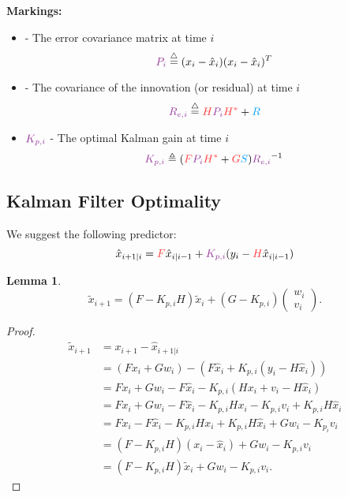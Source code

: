 \documentclass[a4 paper]{article}
\numberwithin{equation}{section}
\theoremstyle{boldStyle}
\theoremstyle{boldBlueStyle}
\newtheorem{lemma}{Lemma}[section]
\theoremstyle{boldPurpleStyle}
\theoremstyle{boldRedStyle}
\theoremstyle{boldGreenStyle}
\begin{document}
\textbf{Markings:}
\begin{itemize}
    \item {} - The error covariance matrix at time \( i \)
    \begin{equation}
        \tpur{P_i} \eqdef (x_i - \hat{x}_i)(x_i - \hat{x}_i)^T
    \end{equation}

    \item {} - The covariance of the innovation (or residual) at time \( i \)
    \begin{equation}
        \tpur{R_{e,i}} \eqdef \tred{H} \tpur{P_i} \tred{H^*} + \tblu{R}  
    \end{equation}

    \item \(\tpur{K_{p,i}}\) - The optimal Kalman gain at time \( i \)
    \begin{equation}
        \tpur{K_{p,i}} \triangleq (\tred{F} \tpur{P_i} \tred{H^*} + \tred{G}\tblu{S}) \tpur{R_{e,i}}^{-1}
    \end{equation}

\end{itemize}

\subsection*{Kalman Filter Optimality}

We suggest the following predictor:
\begin{equation}
    \hat{x}_{i+1|i} = \tred{F} \hat{x}_{i|i-1} + \tpur{K_{p,i}} (y_i - \tred{H} \hat{x}_{i|i-1})
\end{equation}

\begin{lemma}
  \begin{equation}
    \tilde{x}_{i+1} = (F - K_{p,i} H) \tilde{x}_i + (G - K_{p,i}) 
    \begin{pmatrix}
    w_i \\
    v_i
    \end{pmatrix}.
    \end{equation}
\end{lemma}

\begin{proof}
\begin{align*}
\tilde{x}_{i+1} &= x_{i+1} - \hat{x}_{i+1|i} \\
&= (F x_i + G w_i) - \left( F \hat{x}_i + K_{p,i} (y_i - H \hat{x}_i) \right) \\
&= F x_i + G w_i - F \hat{x}_i - K_{p,i} (H x_i + v_i - H \hat{x}_i) \\
&= F x_i + G w_i - F \hat{x}_i - K_{p,i} H x_i - K_{p,i} v_i + K_{p,i} H \hat{x}_i \\
&= F x_i - F \hat{x}_i - K_{p,i} H x_i + K_{p,i} H \hat{x}_i + G w_i - K_{p_i} v_i \\
&= (F - K_{p,i} H)(x_i - \hat{x}_i) + G w_i - K_{p,i} v_i \\
&= (F - K_{p,i} H) \tilde{x}_i + G w_i - K_{p,i} v_i.
\end{align*}
\end{proof}
\end{document}
